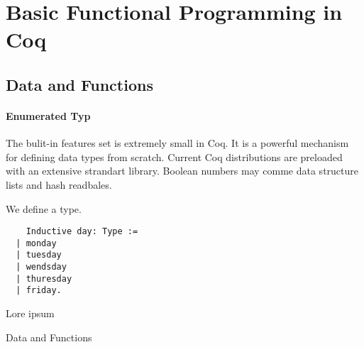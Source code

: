 
\section{Basic Functional Programming in Coq}

\subsection{Data and Functions}
 \paragraph{Enumerated Typ}
  The bulit-in features set is extremely small in Coq. It is a powerful mechanism for defining data types from scratch. Current Coq distributions are preloaded with an extensive strandart library. Boolean numbers may comme data structure lists and hash readbales. 
  \begin{example}
  We define a type.  
  \begin{lstlisting}
    Inductive day: Type :=
  | monday
  | tuesday
  | wendsday
  | thuresday
  | friday.
  \end{lstlisting}
  \end{example}

Lore ipsum \cite{PideAmCaGaGrHrSjYo}


Data and Functions



%
